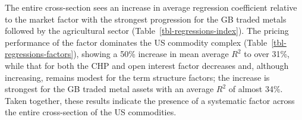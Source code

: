 \documentclass[
  authoryear,
  preprint,
  3p]{elsarticle}
\begin{document}
\medskip

The entire cross-section sees an increase in average regression
coefficient relative to the market factor with the strongest progression
for the GB traded metals followed by the agricultural sector
(Table~\ref{tbl-regressions-index}). The pricing performance of the
factor dominates the US commodity complex
(Table~\ref{tbl-regressions-factors}), showing a 50\% increase in mean
average \(R^{2}\) to over 31\%, while that for both the CHP and open
interest factor decreases and, although increasing, remains modest for
the term structure factors; the increase is strongest for the GB traded
metal assets with an average \(R^{2}\) of almost 34\%. Taken together,
these results indicate the presence of a systematic factor across the
entire cross-section of the US commodities.

\bigskip
\bigskip
\end{document}
